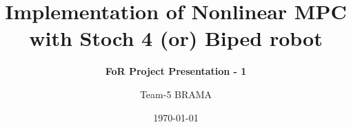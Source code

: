 \title[NMPC Implementation]{
    \textbf{
        Implementation of Nonlinear MPC \\
        with Stoch 4 (or) Biped robot
    }
}
\subtitle[Presentation]{\textcolor{mediumpersianblue}{
        \textbf{FoR Project Presentation - 1} \\
    }}
\author[BRAMA]{%
    Team-5 BRAMA
}
\date{\today}
